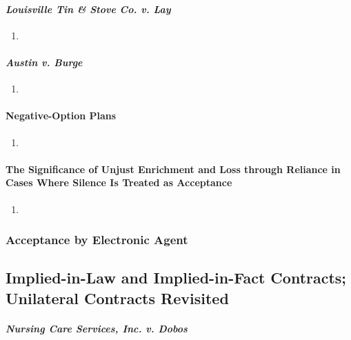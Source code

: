 \paragraph{\emph{Louisville Tin \& Stove Co. v. Lay}}

\begin{enumerate}
    \item %
\end{enumerate}

\paragraph{\emph{Austin v. Burge}}

\begin{enumerate}
    \item %
\end{enumerate}

\paragraph{Negative-Option Plans}

\begin{enumerate}
    \item %
\end{enumerate}

\paragraph{The Significance of Unjust Enrichment and Loss through Reliance in 
Cases Where Silence Is Treated as Acceptance}

\begin{enumerate}
    \item %
\end{enumerate}

\subsubsection{Acceptance by Electronic Agent}


\subsection{Implied-in-Law and Implied-in-Fact Contracts; Unilateral Contracts 
Revisited}

\paragraph{\emph{Nursing Care Services, Inc. v. Dobos}}

